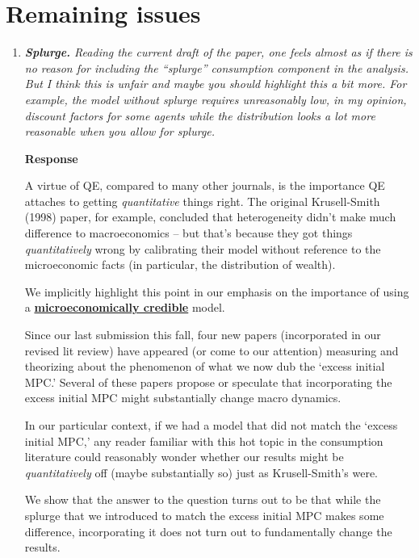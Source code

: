 \documentclass[12pt,letterpaper,english]{article}
\begin{document}
\section{Remaining issues}
\begin{enumerate}
	
\item \textit{\textbf{Splurge.} Reading the current draft of the paper, one feels almost as if there is	no reason for including the ``splurge'' consumption component in the analysis. But I think this is unfair and maybe you should highlight this a bit more. For example, the model without splurge requires unreasonably low, in my opinion, discount factors	for some agents while the distribution looks a lot more reasonable when you allow for splurge.}

  \noindent \textbf{Response}

  A virtue of QE, compared to many other journals, is the importance QE attaches to getting \textit{quantitative} things right.  The original Krusell-Smith (1998) paper, for example, concluded that heterogeneity didn't make much difference to macroeconomics -- but that's because they got things \textit{quantitatively} wrong by calibrating their model without reference to the microeconomic facts (in particular, the distribution of wealth).

  We implicitly highlight this point in our emphasis on the importance of using a \href{https://llorracc.github.io/HAFiscal/#microeconomically-credible}{\textbf{microeconomically credible}} model.

  Since our last submission this fall, four new papers (incorporated in our revised lit review) have appeared (or come to our attention) measuring and theorizing about the phenomenon of what we now dub the `excess initial MPC.'  Several of these papers propose or speculate that incorporating the excess initial MPC might substantially change macro dynamics.

  In our particular context, if we had a model that did not match the `excess initial MPC,' any reader familiar with this hot topic in the consumption literature could reasonably wonder whether our results might be \textit{quantitatively} off (maybe substantially so) just as Krusell-Smith's were.

  We show that the answer to the question turns out to be that while the splurge that we introduced to match the excess initial MPC makes some difference, incorporating it does not turn out to fundamentally change the results.


\end{enumerate}
\end{document}
